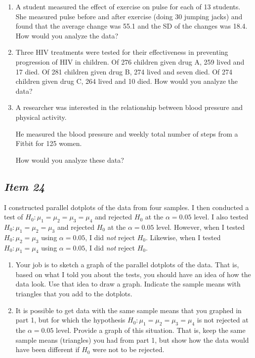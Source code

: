 \begin{enumerate}[leftmargin=1cm, itemsep=.2em]


\item A student measured the effect of exercise on pulse for each of 13 students. She measured pulse before and after exercise (doing 30 jumping jacks) and found that the average change was 55.1 and the SD of the changes was 18.4. How would you analyze the data?


\item Three HIV treatments were tested for their effectiveness in preventing progression of HIV in children. Of 276 children given drug A, 259 lived and 17 died. Of 281 children given drug B, 274 lived and seven died. Of 274 children given drug C, 264 lived and 10 died. How would you analyze the data?


\item A researcher was interested in the relationship between blood pressure and physical activity.


He measured the blood pressure and weekly total number of steps from a Fitbit for 125 women.


How would you analyze these data?


\end{enumerate}





\subsection{\textbf{\textit{Item 24}}} 


I constructed
parallel dotplots of the data from four samples. I then conducted a test of $H_0: \mu_1=\mu_2=\mu_3=\mu_4$ and rejected $H_0$ at the $\alpha = 0.05$ level. I also tested $H_0: \mu_1=\mu_2=\mu_3$ and rejected $H_0$ at the $\alpha = 0.05$ level. However, when I tested $H_0: \mu_2=\mu_3$ using $\alpha = 0.05$, I did \textit{not} reject $H_0$. Likewise, when I tested $H_0: \mu_1=\mu_4$ using $\alpha = 0.05$, I did \textit{not} reject $H_0$.


\begin{enumerate}[leftmargin=1cm, itemsep=.2em]


\item Your job is to sketch a graph of the parallel dotplots of the data. That is, based on what I told you about the tests, you should have an idea of how the data look. Use that idea to draw a graph. Indicate the sample means with triangles that you add to the dotplots.


\item It is possible to get data with the same sample means that you graphed in part 1, but for which the hypothesis $H_0: \mu_1=\mu_2=\mu_3=\mu_4$ is not rejected at the $\alpha = 0.05$ level. Provide a graph of this situation. That is, keep the same sample means (triangles) you had from part 1, but show how the data would have been different if $H_0$ were not to be rejected.


\end{enumerate}





